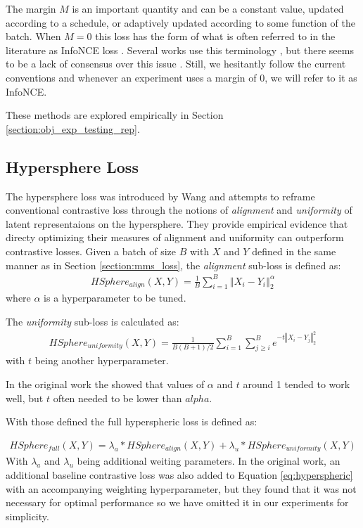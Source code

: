 The margin $M$ is an important quantity and can be a constant value, updated according to a schedule, or adaptively updated according to some function of the batch.
When $M=0$ this loss has the form of what is often referred to in the literature as InfoNCE loss \cite{oord2018representation}.
Several works use this terminology \cite{he2020momentum, hjelm2018learning}, but there seems to be a lack of consensus over this issue \cite{tian2020contrastive}.
Still, we hesitantly follow the current conventions and whenever an experiment uses a margin of 0, we will refer to it as InfoNCE.

These methods are explored empirically in Section \ref{section:obj_exp_testing_rep}.

\subsection{Hypersphere Loss}
The hypersphere loss was introduced by Wang \cite{wang2020understanding} and attempts to reframe conventional contrastive loss through the notions of \textit{alignment} and \textit{uniformity} of latent representaions on the hypersphere.
They provide empirical evidence that directy optimizing their measures of alignment and uniformity can outperform contrastive losses.
Given a batch of size $B$ with $X$ and $Y$ defined in the same manner as in Section \ref{section:mms_loss}, the \textit{alignment} sub-loss is defined as:
\begin{align*}
    HSphere_{align}(X,Y) = \frac{1}{B}\sum_{i=1}^B \left\Vert X_i - Y_i\right\Vert_2^\alpha
\end{align*}
where $\alpha$ is a hyperparameter to be tuned.

The \textit{uniformity} sub-loss is calculated as:
\begin{align*}
    HSphere_{uniformity}(X,Y) = \frac{1}{B(B+1)/2}\sum_{i=1}^B\sum_{j\geq i}^B e^{-t\left\Vert X_i - Y_j\right\Vert_2^2}
\end{align*}
with $t$ being another hyperparameter.

In the original work the showed that values of $\alpha$ and $t$ around 1 tended to work well, but $t$ often needed to be lower than $alpha$.

With those defined the full hyperspheric loss is defined as:

\begin{align}
    \label{eq:hyperspheric}
    HSphere_{full}(X,Y) = \lambda_a*HSphere_{align}(X,Y) + \lambda_u*HSphere_{uniformity}(X,Y)
\end{align}
With $\lambda_a$ and $\lambda_u$ being additional weiting parameters.
In the original work, an additional baseline contrastive loss was also added to Equation \ref{eq:hyperspheric} with an accompanying weighting hyperparameter, but they found that it was not necessary for optimal performance so we have omitted it in our experiments for simplicity.


